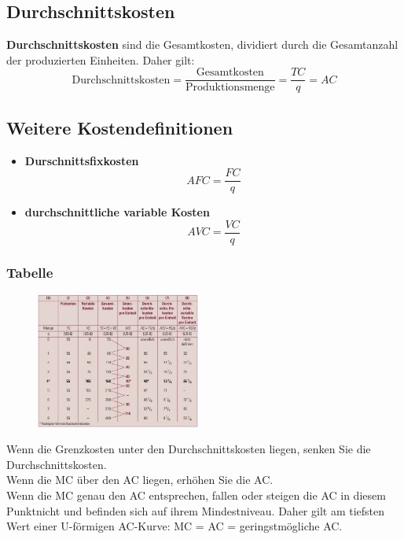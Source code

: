 \documentclass[10pt]{scrartcl}
\begin{document}
\subsection{Durchschnittskosten}
{\bf Durchschnittskosten} sind die Gesamtkosten, dividiert durch die Gesamtanzahl der produzierten Einheiten. Daher gilt:\\
\begin{equation}
\text{Durchschnittskosten} = \frac{\text{Gesamtkosten}}{\text{Produktionsmenge}} = \frac{TC}{q} = AC \nonumber
\end{equation}
\subsection{Weitere Kostendefinitionen}
\begin{itemize}
\item {\bf Durschnittsfixkosten}
\begin{equation}
AFC = \frac{FC}{q} \nonumber
\end{equation}
\item {\bf durchschnittliche variable Kosten}
\begin{equation}
AVC = \frac{VC}{q} \nonumber
\end{equation}
\end{itemize}
\newpage
\subsubsection{Tabelle}
\begin{figure}
\vspace{-20pt}
  \begin{center}
    \includegraphics[width=0.48\textwidth]{img/kosten.jpg}
  \end{center}
  \vspace{-20pt}
\end{figure}
Wenn die Grenzkosten unter den Durchschnittskosten liegen, senken Sie die Durchschnittskosten.\\
Wenn die MC über den AC liegen, erhöhen Sie die AC.\\
Wenn die MC genau den AC entsprechen, fallen oder steigen die AC in diesem Punktnicht und befinden sich auf ihrem Mindestniveau. Daher gilt am tiefsten Wert einer U-förmigen AC-Kurve: MC = AC = geringstmögliche AC.\\ \\ \\ \\  \\ \\ 
\end{document}
